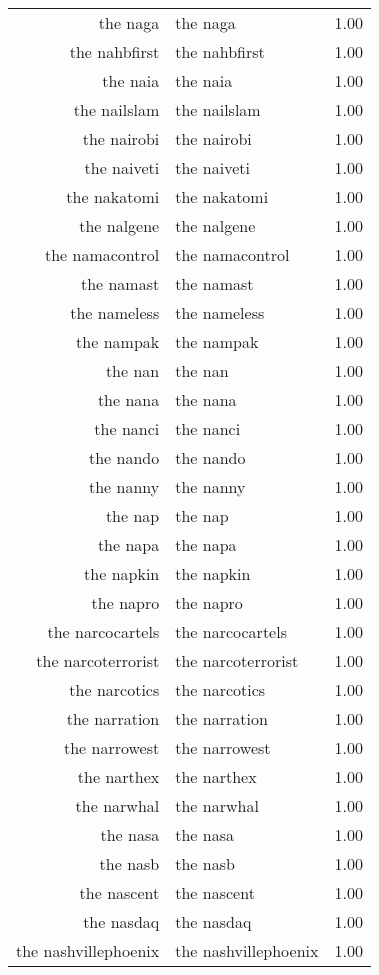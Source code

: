 \begin{table}[ht]
\begin{tabular}{rlr}
  the naga & the naga & 1.00 \\ 
  the nahbfirst & the nahbfirst & 1.00 \\ 
  the naia & the naia & 1.00 \\ 
  the nailslam & the nailslam & 1.00 \\ 
  the nairobi & the nairobi & 1.00 \\ 
  the naiveti & the naiveti & 1.00 \\ 
  the nakatomi & the nakatomi & 1.00 \\ 
  the nalgene & the nalgene & 1.00 \\ 
  the namacontrol & the namacontrol & 1.00 \\ 
  the namast & the namast & 1.00 \\ 
  the nameless & the nameless & 1.00 \\ 
  the nampak & the nampak & 1.00 \\ 
  the nan & the nan & 1.00 \\ 
  the nana & the nana & 1.00 \\ 
  the nanci & the nanci & 1.00 \\ 
  the nando & the nando & 1.00 \\ 
  the nanny & the nanny & 1.00 \\ 
  the nap & the nap & 1.00 \\ 
  the napa & the napa & 1.00 \\ 
  the napkin & the napkin & 1.00 \\ 
  the napro & the napro & 1.00 \\ 
  the narcocartels & the narcocartels & 1.00 \\ 
  the narcoterrorist & the narcoterrorist & 1.00 \\ 
  the narcotics & the narcotics & 1.00 \\ 
  the narration & the narration & 1.00 \\ 
  the narrowest & the narrowest & 1.00 \\ 
  the narthex & the narthex & 1.00 \\ 
  the narwhal & the narwhal & 1.00 \\ 
  the nasa & the nasa & 1.00 \\ 
  the nasb & the nasb & 1.00 \\ 
  the nascent & the nascent & 1.00 \\ 
  the nasdaq & the nasdaq & 1.00 \\ 
  the nashvillephoenix & the nashvillephoenix & 1.00 \\ 

\end{tabular}
\end{table}
